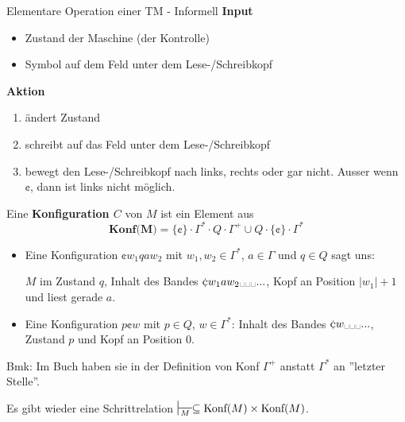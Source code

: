 \documentclass[a4paper, 11pt]{article}
\begin{document}
        \begin{mainbox}{Elementare Operation einer TM - Informell}
            \textbf{Input}
            \begin{itemize}[label = -]
                \item Zustand der Maschine (der Kontrolle)
                \item Symbol auf dem Feld unter dem Lese-/Schreibkopf
            \end{itemize}
            \textbf{Aktion}
            \begin{enumerate}[label=(\roman*)]
                \item ändert Zustand
                \item schreibt auf das Feld unter dem Lese-/Schreibkopf
                \item bewegt den Lese-/Schreibkopf nach links, rechts oder gar nicht. Ausser wenn $\cent$, dann ist links nicht möglich.
            \end{enumerate}
        \end{mainbox}
    
        \begin{mainbox}{}
            Eine \textbf{Konfiguration $C$} von $M$ ist ein Element aus 
            $$\textbf{Konf($\mathbf{M}$)} =  \{\cent\} \cdot \Gamma^* \cdot Q \cdot \Gamma^+ \cup Q \cdot \{\cent\} \cdot \Gamma^*$$
        \end{mainbox}
        \begin{itemize}[label=-]
            \item Eine Konfiguration $\cent w_1qaw_2$ mit $w_1, w_2 \in \Gamma^*$, $a \in \Gamma$ und $q \in Q$ sagt uns:
            
            $M$ im Zustand $q$, Inhalt des Bandes $\cent w_1aw_2 \text{\textvisiblespace} \text{\textvisiblespace} \text{\textvisiblespace}...$, Kopf an Position $|w_1|+1$ und liest gerade $a$.
            \item Eine Konfiguration $p\cent w$ mit $p \in Q$, $w\in \Gamma^*$: Inhalt des Bandes $\cent w \text{\textvisiblespace}  \text{\textvisiblespace}  \text{\textvisiblespace}...$, Zustand $p$ und Kopf an Position $0$. 
        \end{itemize}
        Bmk: Im Buch haben sie in der Definition von Konf $\Gamma^+$ anstatt $\Gamma^*$ an ''letzter Stelle''.
    
        Es gibt wieder eine Schrittrelation $\sststile{M}{} \subseteq \text{Konf}(M) \times \text{Konf}(M)$.
    
\end{document}

